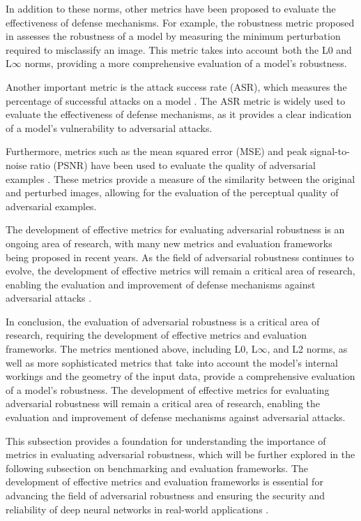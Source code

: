 \documentclass[11pt]{article}
\begin{document}
In addition to these norms, other metrics have been proposed to evaluate the effectiveness of defense mechanisms. For example, the robustness metric proposed in \cite{ref100} assesses the robustness of a model by measuring the minimum perturbation required to misclassify an image. This metric takes into account both the L0 and L\(\infty\) norms, providing a more comprehensive evaluation of a model's robustness.

Another important metric is the attack success rate (ASR), which measures the percentage of successful attacks on a model \cite{ref173}. The ASR metric is widely used to evaluate the effectiveness of defense mechanisms, as it provides a clear indication of a model's vulnerability to adversarial attacks.

Furthermore, metrics such as the mean squared error (MSE) and peak signal-to-noise ratio (PSNR) have been used to evaluate the quality of adversarial examples \cite{ref174}. These metrics provide a measure of the similarity between the original and perturbed images, allowing for the evaluation of the perceptual quality of adversarial examples.

The development of effective metrics for evaluating adversarial robustness is an ongoing area of research, with many new metrics and evaluation frameworks being proposed in recent years. As the field of adversarial robustness continues to evolve, the development of effective metrics will remain a critical area of research, enabling the evaluation and improvement of defense mechanisms against adversarial attacks \cite{ref175}.

In conclusion, the evaluation of adversarial robustness is a critical area of research, requiring the development of effective metrics and evaluation frameworks. The metrics mentioned above, including L0, L\(\infty\), and L2 norms, as well as more sophisticated metrics that take into account the model's internal workings and the geometry of the input data, provide a comprehensive evaluation of a model's robustness. The development of effective metrics for evaluating adversarial robustness will remain a critical area of research, enabling the evaluation and improvement of defense mechanisms against adversarial attacks.

This subsection provides a foundation for understanding the importance of metrics in evaluating adversarial robustness, which will be further explored in the following subsection on benchmarking and evaluation frameworks. The development of effective metrics and evaluation frameworks is essential for advancing the field of adversarial robustness and ensuring the security and reliability of deep neural networks in real-world applications \cite{ref156}.
\end{document}
